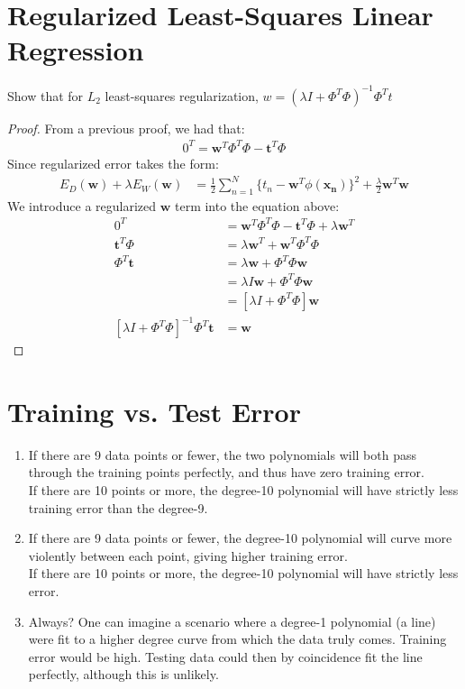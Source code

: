 \documentclass{article}
\begin{document}
\section{Regularized Least-Squares Linear Regression}
Show that for $L_2$ least-squares regularization, $w = (\lambda I + \Phi^T\Phi)^{-1}\Phi^Tt$
\begin{proof}
  From a previous proof, we had that:
  \begin{align*}
    0^T = \mathbf{w}^T\Phi^T\Phi - \mathbf{t}^T\Phi
  \end{align*}
  Since regularized error takes the form:
  \begin{align*}
    E_D(\mathbf{w}) + \lambda E_W(\mathbf{w}) &=
    \frac{1}{2}\sum^N_{n=1}\{t_n - \mathbf{w}^T\phi(\mathbf{x_n})\}^2 + \frac{\lambda}{2}\mathbf{w}^T\mathbf{w}
  \end{align*}
  We introduce a regularized $\mathbf{w}$ term into the equation above:
  \begin{align*}
    0^T &= \mathbf{w}^T\Phi^T\Phi - \mathbf{t}^T\Phi + \lambda\mathbf{w}^T\\
    \mathbf{t}^T\Phi &= \lambda\mathbf{w}^T + \mathbf{w}^T\Phi^T\Phi\\
    \Phi^T\mathbf{t} &= \lambda\mathbf{w} + \Phi^T\Phi\mathbf{w}\\
    &= \lambda I\mathbf{w} + \Phi^T\Phi\mathbf{w}\\
    &= [\lambda I + \Phi^T\Phi]\mathbf{w}\\
    [\lambda I + \Phi^T\Phi]^{-1}\Phi^T\mathbf{t} &= \mathbf{w}
  \end{align*}
\end{proof}


\section{Training vs. Test Error}
\begin{enumerate}
\item {} If there are 9 data points or fewer, the two polynomials
will   both pass through the training points perfectly, and thus have zero  
training error.\\   If there are 10 points or more, the degree-10 polynomial
will have strictly   less training error than the degree-9.
\item {} If there are 9 data points or fewer, the degree-10 polynomial
  will curve more violently between each point, giving higher training
  error.\\
  If there are 10 points or more, the degree-10 polynomial will have
  strictly less error.
\item Always?  One can imagine a scenario where a degree-1
  polynomial (a line) were fit to a higher degree curve from which the data
  truly comes. Training error would be high.
  Testing data could then by coincidence fit the line perfectly, although
  this is unlikely.
\end{enumerate}
\end{document}
